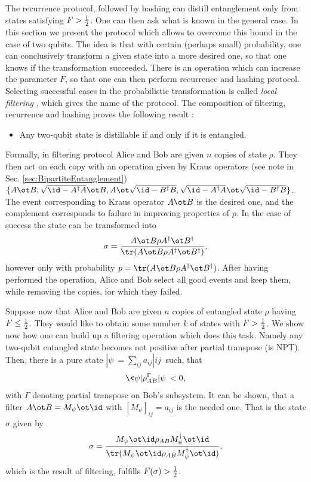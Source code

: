 \documentclass[rmp,12pt,preprint]{revtex4-2}
\begin{document}
The recurrence protocol, followed by hashing can distill entanglement
only from states satisfying $F>{1\over 2}$. One can then ask what is
known in the general case.  In this section we present the protocol
which allows to overcome this bound in the case of two qubits. The
idea is that with certain (perhaps small) probability, one can
conclusively transform a given state into a more desired one, so that
one knows if the transformation succeeded. There is an operation which
can increase the parameter $F$, so that one can then perform
recurrence and hashing protocol. Selecting successful cases in the
probabilistic transformation is called {\it local filtering}
\cite{Gisin96}, which gives the name of the protocol. The composition
of filtering, recurrence and hashing proves the following result
\cite{HHH1997-distill}:

\begin{itemize}
\item Any two-qubit state is distillable if and only if it is
  entangled.
\end{itemize}

Formally, in filtering protocol Alice and Bob are given $n$ copies of
state $\rho$. They then act on each copy with an operation given by
Kraus operators (see note in Sec. \ref{sec:BipartiteEntanglement})
$\{A\ot B ,\sqrt{\id-A^{\dagger}A}\ot B, A\ot\sqrt{\id-B^{\dagger}B},
\sqrt{\id-A^{\dagger}A}\ot \sqrt{\id-B^{\dagger}B} \}$. The event
corresponding to Kraus operator $A\ot B$ is the desired one, and the
complement corresponds to failure in improving properties of $\rho$.
In the case of success the state can be transformed into
\begin{equation}
\sigma = {A\ot B\rho A^{\dagger}\ot B^{\dagger}\over {\tr}(A\ot B
\rho A^{\dagger}\ot B^{\dagger})},
\end{equation}
however only with probability $p= {\tr}(A\ot B \rho A^{\dagger}\ot
B^{\dagger})$. After having performed the operation, Alice and Bob
select all good events and keep them, while removing the copies, for
which they failed.

Suppose now that Alice and Bob are given $n$ copies of entangled
state $\rho$ having $F \leq {1\over 2}$. They would like to obtain
some number $k$ of states with $F>{1\over 2}$. We show now how one
can build up a filtering operation which does this task. Namely any
two-qubit entangled state becomes not positive after
partial transpose (is NPT). Then, there is a pure state
$|\psi\>=\sum_{ij}a_{ij}|ij\>$ such, that
\begin{equation}
\<\psi|\rho^{\Gamma}_{AB}|\psi\> <0,
\end{equation}
with $\Gamma$ denoting partial transpose on Bob's subsystem. It can be
shown, that a filter $A\ot B = M_{\psi}\ot \id$ with
$[M_{\psi}]_{ij}=a_{ij}$ is the needed one. That is the state $\sigma$
given by
\begin{equation}
  \sigma={{M_{\psi}\ot \id \rho_{AB}M_{\psi}^{\dagger}\ot
      \id}\over {\tr}(M_{\psi}\ot \id \rho_{AB}M_{\psi}^{\dagger}\ot \id)},
\end{equation}
which is the result of filtering, fulfills $F(\sigma)> {1\over 2}$.
\end{document}
